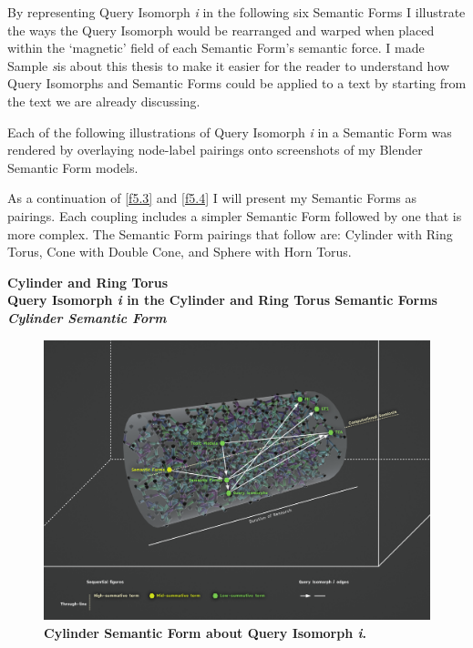 By representing Query Isomorph \textit{i} in the following six Semantic Forms I illustrate the ways the Query Isomorph would be rearranged and warped when placed within the ‘magnetic’ field of each Semantic Form’s semantic force. I made Sample \textit{s}is about this thesis to make it easier for the reader to understand how Query Isomorphs and Semantic Forms could be applied to a text by starting from the text we are already discussing. 

Each of the following illustrations of Query Isomorph \textit{i} in a Semantic Form was rendered by overlaying node-label pairings onto screenshots of my Blender Semantic Form models.

As a continuation of \autoref{f5.3} and \autoref{f5.4} I will present my Semantic Forms as pairings. Each coupling includes a simpler Semantic Form followed by one that is more complex. The Semantic Form pairings that follow are: Cylinder with Ring Torus, Cone with Double Cone, and Sphere with Horn Torus. 

\noindent \textbf{Cylinder and Ring Torus}
\\

\textbf{Query Isomorph \textit{i} in the Cylinder and Ring Torus Semantic Forms}
\\

\textbf{\textit{Cylinder Semantic Form}}

\FloatBarrier  
\begin{figure}[h!]
    \centering
    \includegraphics[width=\textwidth]{figures/5.10.Cylinder.png}
    \caption[Cylinder Semantic Form about Query Isomorph \textit{i}]{\textbf{Cylinder Semantic Form about Query Isomorph \textit{i}.} }
    \label{f5.10.Cylinder}
\end{figure}
\FloatBarrier  

